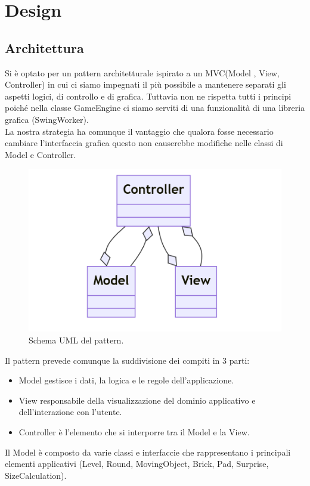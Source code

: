\documentclass[a4paper,12pt]{report}
\begin{document}
\chapter{Design}
\section{Architettura}
Si è optato per un pattern architetturale ispirato a un MVC(Model , View, Controller) in cui ci siamo impegnati il più
possibile a mantenere separati gli aspetti logici, di controllo e di grafica. Tuttavia non ne rispetta tutti i principi poiché nella classe GameEngine ci siamo
serviti di una funzionalità di una libreria grafica (SwingWorker).
\\La nostra strategia ha comunque il vantaggio che qualora fosse necessario cambiare l'interfaccia grafica
questo non causerebbe modifiche nelle classi di Model e Controller.
\begin{figure}[H]
    \centering{}
    \includegraphics[scale=0.5]{images/MVC.png}
    \caption{Schema UML del pattern.}
    \label{images:MVC}
\end{figure}
Il pattern prevede comunque la suddivisione dei compiti in 3 parti:
\begin{itemize}
    \item Model gestisce i dati, la logica e le regole dell'applicazione.
    \item View responsabile della visualizzazione del dominio applicativo e dell'interazione con l'utente.
    \item Controller è l'elemento che si interporre tra il Model e la View.
\end{itemize}
Il Model è composto da varie classi e interfaccie che rappresentano i principali elementi applicativi (Level, Round, MovingObject, Brick, Pad, Surprise, SizeCalculation).
\end{document}
